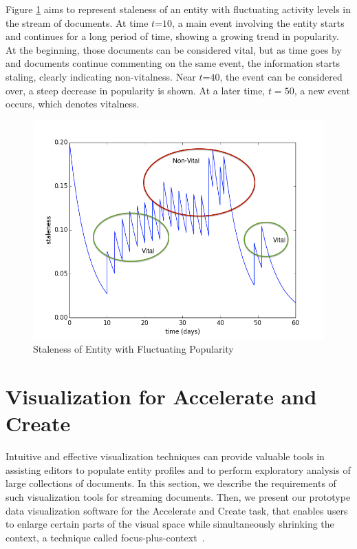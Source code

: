\documentclass{article}
\begin{document}
Figure \ref{stalenessmedium} aims to represent staleness of an entity with fluctuating activity levels in the stream of documents. At time $t\mathord{=}10$, a main event involving the entity starts and continues for a long period of time, showing a growing trend in popularity. 
At the beginning, those documents can be considered vital, but as time goes by and documents continue commenting on the same event, the information starts staling, clearly indicating non-vitalness.
Near $t\mathord{=}40$, the event can be considered over, a steep decrease in popularity is shown. At a later time, $t=50$, a new event occurs, which denotes vitalness.

\begin{figure}[tb]
\centering
\includegraphics[width=0.7\columnwidth]{fig/staleness2.png}
\caption{Staleness of Entity with Fluctuating Popularity}
\label{stalenessmedium}
\end{figure}

\section{Visualization for Accelerate and Create}

Intuitive and effective visualization techniques can provide valuable tools in assisting editors to populate entity profiles and to perform exploratory analysis of large collections of documents. 
In this section, we describe the requirements of such visualization tools for streaming documents.
Then, we present our prototype data visualization software for the Accelerate and Create task, that enables users to enlarge certain parts of the visual space while simultaneously shrinking the context, a technique called focus-plus-context~\cite{Artur2010}.
\end{document}
